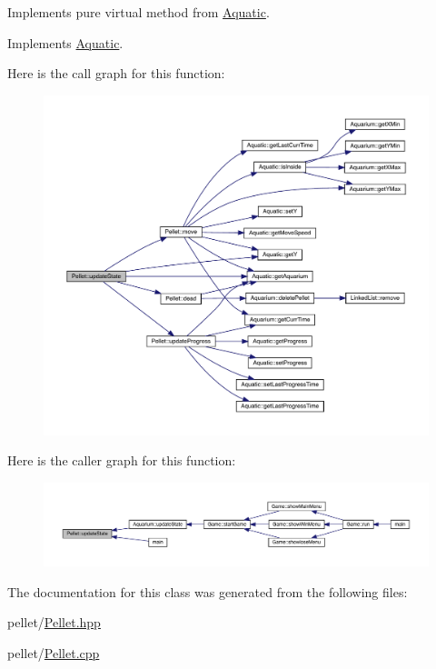 Implements pure virtual method from \mbox{\hyperlink{class_aquatic}{Aquatic}}. 



Implements \mbox{\hyperlink{class_aquatic_a51e44c95476d72a841fea667c6cbbedc}{Aquatic}}.

Here is the call graph for this function\+:\nopagebreak
\begin{figure}[H]
\begin{center}
\leavevmode
\includegraphics[width=350pt]{class_pellet_ab21f88899eba022e1693d911eba9dbfb_cgraph}
\end{center}
\end{figure}
Here is the caller graph for this function\+:
\nopagebreak
\begin{figure}[H]
\begin{center}
\leavevmode
\includegraphics[width=350pt]{class_pellet_ab21f88899eba022e1693d911eba9dbfb_icgraph}
\end{center}
\end{figure}


The documentation for this class was generated from the following files\+:\begin{DoxyCompactItemize}
\item 
pellet/\mbox{\hyperlink{_pellet_8hpp}{Pellet.\+hpp}}\item 
pellet/\mbox{\hyperlink{_pellet_8cpp}{Pellet.\+cpp}}\end{DoxyCompactItemize}
